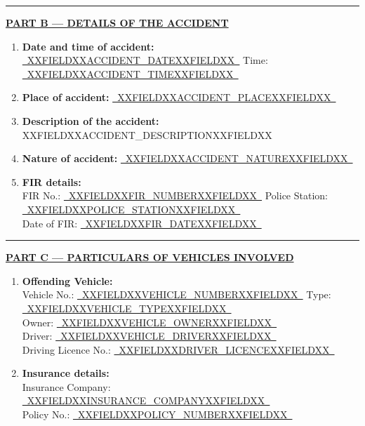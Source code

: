 \documentclass[12pt,a4paper]{article}
\newcommand{\fillline}[1]{\underline{~#1~}}
\begin{document}
\vspace{1em}
\rule{\linewidth}{0.4pt}

\noindent\textbf{\uline{PART B --- DETAILS OF THE ACCIDENT}}

\vspace{0.5em}

\begin{enumerate}[label=\textbf{\arabic*.}, leftmargin=2em, itemsep=0.6em, start=6]

    \item \textbf{Date and time of accident:} \fillline{XXFIELDXXACCIDENT_DATEXXFIELDXX} \quad Time: \fillline{XXFIELDXXACCIDENT_TIMEXXFIELDXX}

    \item \textbf{Place of accident:} \fillline{XXFIELDXXACCIDENT_PLACEXXFIELDXX}

    \item \textbf{Description of the accident:} XXFIELDXXACCIDENT_DESCRIPTIONXXFIELDXX

    \item \textbf{Nature of accident:} \fillline{XXFIELDXXACCIDENT_NATUREXXFIELDXX}

    \item \textbf{FIR details:}\\
          FIR No.: \fillline{XXFIELDXXFIR_NUMBERXXFIELDXX} \quad Police Station: \fillline{XXFIELDXXPOLICE_STATIONXXFIELDXX}\\
          Date of FIR: \fillline{XXFIELDXXFIR_DATEXXFIELDXX}

\end{enumerate}

\vspace{1em}
\rule{\linewidth}{0.4pt}

\noindent\textbf{\uline{PART C --- PARTICULARS OF VEHICLES INVOLVED}}

\vspace{0.5em}

\begin{enumerate}[label=\textbf{\arabic*.}, leftmargin=2em, itemsep=0.6em, start=11]

    \item \textbf{Offending Vehicle:}\\
          Vehicle No.: \fillline{XXFIELDXXVEHICLE_NUMBERXXFIELDXX} \quad Type: \fillline{XXFIELDXXVEHICLE_TYPEXXFIELDXX}\\
          Owner: \fillline{XXFIELDXXVEHICLE_OWNERXXFIELDXX}\\
          Driver: \fillline{XXFIELDXXVEHICLE_DRIVERXXFIELDXX}\\
          Driving Licence No.: \fillline{XXFIELDXXDRIVER_LICENCEXXFIELDXX}

    \item \textbf{Insurance details:}\\
          Insurance Company: \fillline{XXFIELDXXINSURANCE_COMPANYXXFIELDXX}\\
          Policy No.: \fillline{XXFIELDXXPOLICY_NUMBERXXFIELDXX}

\end{enumerate}
\end{document}

